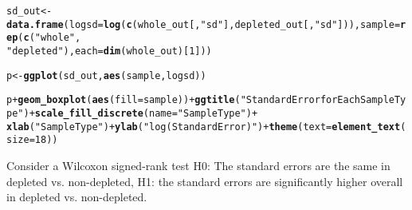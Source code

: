 \documentclass{article}\usepackage[]{graphicx}\usepackage[]{color}
\makeatletter
\newcommand{\hlnum}[1]{\textcolor[rgb]{0.686,0.059,0.569}{#1}}%
\newcommand{\hlstr}[1]{\textcolor[rgb]{0.192,0.494,0.8}{#1}}%
\newcommand{\hlopt}[1]{\textcolor[rgb]{0,0,0}{#1}}%
\newcommand{\hlstd}[1]{\textcolor[rgb]{0.345,0.345,0.345}{#1}}%
\newcommand{\hlkwb}[1]{\textcolor[rgb]{0.69,0.353,0.396}{#1}}%
\newcommand{\hlkwc}[1]{\textcolor[rgb]{0.333,0.667,0.333}{#1}}%
\newcommand{\hlkwd}[1]{\textcolor[rgb]{0.737,0.353,0.396}{\textbf{#1}}}%
\newenvironment{kframe}{%
 \def\at@end@of@kframe{}%
 \ifinner\ifhmode%
  \def\at@end@of@kframe{\end{minipage}}%
  \begin{minipage}{\columnwidth}%
 \fi\fi%
 \def\FrameCommand##1{\hskip\@totalleftmargin \hskip-\fboxsep
 \colorbox{shadecolor}{##1}\hskip-\fboxsep
     \hskip-\linewidth \hskip-\@totalleftmargin \hskip\columnwidth}%
 \MakeFramed {\advance\hsize-\width
   \@totalleftmargin\z@ \linewidth\hsize
   \@setminipage}}%
 {\par\unskip\endMakeFramed%
 \at@end@of@kframe}
\newenvironment{knitrout}{}{} %
\makeatother
\begin{document}
\begin{knitrout}
\color{fgcolor}\begin{kframe}
\begin{alltt}
\hlstd{sd_out} \hlkwb{<-} \hlkwd{data.frame}\hlstd{(}\hlkwc{logsd} \hlstd{=} \hlkwd{log}\hlstd{(}\hlkwd{c}\hlstd{(whole_out[,} \hlstr{"sd"}\hlstd{], depleted_out[,} \hlstr{"sd"}\hlstd{])),} \hlkwc{sample} \hlstd{=} \hlkwd{rep}\hlstd{(}\hlkwd{c}\hlstd{(}\hlstr{"whole"}\hlstd{,}
    \hlstr{"depleted"}\hlstd{),} \hlkwc{each} \hlstd{=} \hlkwd{dim}\hlstd{(whole_out)[}\hlnum{1}\hlstd{]))}
\end{alltt}


{\ttfamily\noindent\bfseries\color{errorcolor}{\#\# Error: subscript out of bounds}}\begin{alltt}
\hlstd{p} \hlkwb{<-} \hlkwd{ggplot}\hlstd{(sd_out,} \hlkwd{aes}\hlstd{(sample, logsd))}
\end{alltt}


{\ttfamily\noindent\bfseries\color{errorcolor}{\#\# Error: object 'sd\_out' not found}}\begin{alltt}
\hlstd{p} \hlopt{+} \hlkwd{geom_boxplot}\hlstd{(}\hlkwd{aes}\hlstd{(}\hlkwc{fill} \hlstd{= sample))} \hlopt{+} \hlkwd{ggtitle}\hlstd{(}\hlstr{"Standard Error for Each Sample Type"}\hlstd{)} \hlopt{+} \hlkwd{scale_fill_discrete}\hlstd{(}\hlkwc{name} \hlstd{=} \hlstr{"Sample Type"}\hlstd{)} \hlopt{+}
    \hlkwd{xlab}\hlstd{(}\hlstr{"Sample Type"}\hlstd{)} \hlopt{+} \hlkwd{ylab}\hlstd{(}\hlstr{"log(Standard Error)"}\hlstd{)} \hlopt{+} \hlkwd{theme}\hlstd{(}\hlkwc{text} \hlstd{=} \hlkwd{element_text}\hlstd{(}\hlkwc{size} \hlstd{=} \hlnum{18}\hlstd{))}
\end{alltt}


{\ttfamily\noindent\bfseries\color{errorcolor}{\#\# Error: object 'p' not found}}\end{kframe}
\end{knitrout}

Consider a Wilcoxon signed-rank test H0: The standard errors are the same in depleted vs. non-depleted, H1: the standard errors are significantly higher overall in depleted vs. non-depleted.  
\end{document}
